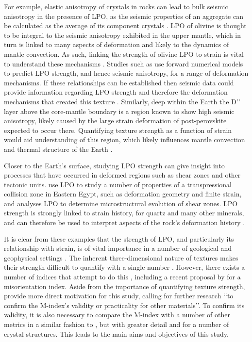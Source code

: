 \documentclass[a4paper,12pt,twoside]{report}
\numberwithin{equation}{chapter}
\begin{document}
For example, elastic anisotropy of crystals in rocks can lead to bulk seismic anisotropy in the presence of LPO, as the seismic properties of an aggregate can be calculated as the average of its component crystals \citep{Tommasi1999}. LPO of olivine is thought to be integral to the seismic anisotropy exhibited in the upper mantle, which in turn is linked to many aspects of deformation and likely to the dynamics of mantle convection. As such, linking the strength of olivine LPO to strain is vital to understand these mechanisms \citep[e.g.][]{Warren2008}. Studies such as \cite{Tommasi2000} use forward numerical models to predict LPO strength, and hence seismic anisotropy, for a range of deformation mechanisms. If these relationships can be established then seismic data could provide information regarding LPO strength and therefore the deformation mechanisms that created this texture \citep[see][for details of a number of other approaches to this problem]{Blackman2002}. Similarly, deep within the Earth the D\rq\rq{} layer \citep{Garnero2008} above the core-mantle boundary is a region known to show high seismic anisotropy, likely caused by the large strain deformation of post-perovskite expected to occur there. Quantifying texture strength as a function of strain would aid understanding of this region, which likely influences mantle convection and thermal structure of the Earth \citep{Miyagi2010}. 

Closer to the Earth's surface, studying LPO strength can give insight into processes that have occurred in deformed regions such as shear zones and other tectonic units. \cite{Unzog2000} use LPO to study a number of properties of a transpressional collision zone in Eastern Egypt, such as deformation geometry and finite strain, and \cite{Lloyd2004} analyses LPO to determine microstructural evolution of shear zones. LPO strength is strongly linked to strain history, for quartz and many other minerals, and can therefore be used to interpret aspects of the rock's deformation history \cite{Price1985}.

It is clear from these examples that the strength of LPO, and particularly its relationship with strain, is of vital importance in a number of geological and geophysical settings \citep[and many more besides, see][for more examples]{Wenk1999}. The inherent three-dimensional nature of textures makes their strength difficult to quantify with a single number \citep{Schaeben2007}. However, there exists a number of indices that attempt to do this \citep[e.g. the texture index][]{bunge1982texture}, including a recent proposal by \cite{Skemer} for a misorientation index. Aside from the importance of quantifying texture strength, \cite{Skemer} provide more direct motivation for this study, calling for further research \lq\lq{}to confirm the M-index's validity or practicality for other materials\rq\rq{}. To confirm its validity, it is also necessary to compare the M-index with a number of other metrics in a similar fashion to \cite{Mainprice}, but with greater detail and for a number of crystal structures. This leads to the main aims and objectives of this study.   
   
\end{document}
